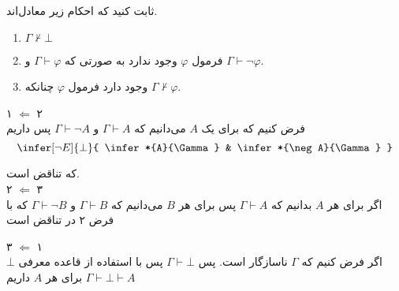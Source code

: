 
	
	ثابت کنید که احکام زیر معادل‌اند.
	\begin{enumerate}
		\item $\Gamma\nvdash \bot$	
		\item فرمول
		$\varphi$
		وجود ندارد به صورتی که 
		$\Gamma \vdash \varphi$ 
		و
		$\Gamma \vdash \neg \varphi$.
		
		\item وجود دارد فرمول
		$\varphi$
		چنانکه $\Gamma \nvdash \varphi$.
		
	\end{enumerate}
	
	\quad\vspace {-0.5 cm}
	\begin{ans}
		۱ $\Leftarrow$ ۲ \\
		فرض کنیم که برای یک $A$ می‌دانیم که
		$\Gamma \vdash A$
		و 
		$\Gamma \vdash \neg A$
		پس داریم
		$$
		\infer[\neg E]{\bot}{
			\infer*{A}{\Gamma}
			&
			\infer*{\neg A}{\Gamma}
		}	
		$$ 
		
		که تناقض است.\\
		۲ $\Leftarrow$ ۳ \\
		اگر برای هر 
		$A$
		بدانیم که
		$\Gamma \vdash A$
		پس برای هر 
		$B$
		می‌دانیم که 
		$\Gamma \vdash B$ و
		$\Gamma \vdash \neg B$
		که با فرض ۲ در تناقض است
		
		۳ $\Leftarrow$ ۱ \\
		اگر فرض کنیم که 
		$\Gamma$ 
		ناسازگار است.
		پس
		$\Gamma \vdash \bot$
		پس با استفاده از قاعده معرفی 
		$\bot$
		برای هر
		$A$
		داریم
		$\Gamma \vdash \bot \vdash A$
		
	\end{ans}

